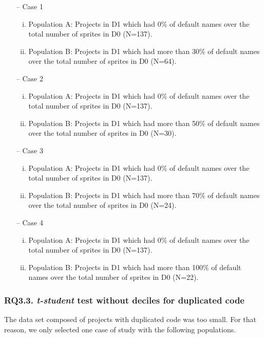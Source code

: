 \begin{itemize}
    \item[--] Case 1
    \begin{enumerate}[(i)]
        \item Population A: Projects in D1 which had 0\% of default names over the total number of sprites in D0 (N=137).
        \item Population B: Projects in D1 which had more than 30\% of default names over the total number of sprites  in D0 (N=64).
    \end{enumerate}
    \item[--] Case 2
    \begin{enumerate}[(i)]
        \item Population A: Projects in D1 which had 0\% of default names over the total number of sprites in D0 (N=137).
        \item Population B: Projects in D1 which had more than 50\% of default names over the total number of sprites  in D0 (N=30).
    \end{enumerate}
    \item[--] Case 3
    \begin{enumerate}[(i)]
        \item Population A: Projects in D1 which had 0\% of default names over the total number of sprites in D0 (N=137).
        \item Population B: Projects in D1 which had more than 70\% of default names over the total number of sprites  in D0 (N=24).
    \end{enumerate}
    \item[--] Case 4
    \begin{enumerate}[(i)]
        \item Population A: Projects in D1 which had 0\% of default names over the total number of sprites in D0 (N=137).
        \item Population B: Projects in D1 which had more than 100\% of default names over the total number of sprites in D0 (N=22).
    \end{enumerate}
\end{itemize}


\subsubsection{RQ3.3. \textit{t-student} test without deciles for duplicated code}
\label{subsubsec:RQ3_3_statistical}

The data set composed of projects with duplicated code was too small. For that reason, we only selected one case of study with the following populations. 

